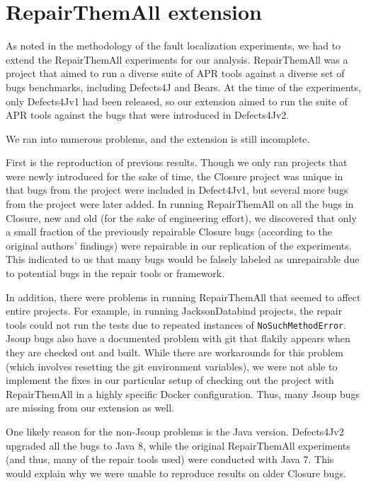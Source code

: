 \documentclass[10pt,journal,compsoc]{IEEEtran}
\begin{document}
\section*{RepairThemAll extension}

As noted in the methodology of the fault localization experiments, we had to extend the RepairThemAll experiments for our analysis.
RepairThemAll was a project that aimed to run a diverse suite of APR tools against a diverse set of bugs benchmarks,
including Defects4J and Bears.
At the time of the experiments, only Defects4Jv1 had been released, so our extension aimed to run the suite of APR tools 
against the bugs that were introduced in Defects4Jv2.

We ran into numerous problems, and the extension is still incomplete.

First is the reproduction of previous results. 
Though we only ran projects that were newly introduced for the sake of time, 
the Closure project was unique in that bugs from the project were included in Defect4Jv1,
but several more bugs from the project were later added.
In running RepairThemAll on all the bugs in Closure, new and old (for the sake of engineering effort), 
we discovered that only a small fraction of the previously repairable Closure bugs (according to the original authors' findings)
were repairable in our replication of the experiments.
This indicated to us that many bugs would be falsely labeled as unrepairable
due to potential bugs in the repair tools or framework.

In addition, there were problems in running RepairThemAll that seemed to affect entire projects.
For example, in running JacksonDatabind projects, the repair tools could not run the tests due to 
repeated instances of \texttt{NoSuchMethodError}.
Jsoup bugs also have a documented problem with git that flakily appears when they are checked out and built.
While there are workarounds for this problem (which involves resetting the git environment variables),
we were not able to implement the fixes in our particular setup of checking out the project with RepairThemAll in 
a highly specific Docker configuration.
Thus, many Jsoup bugs are missing from our extension as well.

One likely reason for the non-Jsoup problems is the Java version. 
Defects4Jv2 upgraded all the bugs to Java 8, while the original RepairThemAll experiments 
(and thus, many of the repair tools used) were conducted with Java 7.
This would explain why we were unable to reproduce results on older Closure bugs.
\end{document}
